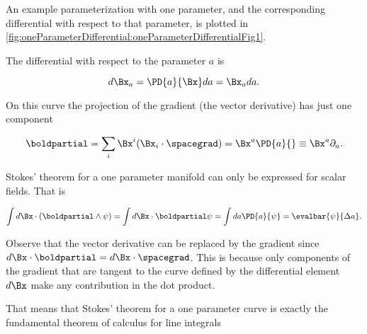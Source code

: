 %
%
An example parameterization with one parameter, and the corresponding differential with respect to that parameter, is plotted in
\cref{fig:oneParameterDifferential:oneParameterDifferentialFig1}.


The differential with respect to the parameter \( a \) is

\begin{equation}\label{eqn:oneparameter:20}
d\Bx_a = \PD{a}{\Bx} da = \Bx_a da.
\end{equation}

On this curve the projection of the gradient (the vector derivative) has just one component

\begin{dmath}\label{eqn:oneparameter:40}
\boldpartial
=
\sum_i \Bx^i (\Bx_i \cdot \spacegrad)
=
\Bx^a \PD{a}{}
\equiv
\Bx^a \partial_a.
\end{dmath}

Stokes' theorem for a one parameter manifold can only be expressed for scalar fields.
That is

\begin{dmath}\label{eqn:oneparameter:60}
\int d\Bx \cdot (\boldpartial \wedge \psi)
=
\int d\Bx \cdot \boldpartial \psi
=
\int da \PD{a}{ \psi }
= \evalbar{\psi}{\Delta a}.
\end{dmath}

Observe that the vector derivative can be replaced by the gradient since \( d\Bx \cdot \boldpartial = d\Bx \cdot \spacegrad \).
This is because only components of the gradient that are tangent to the curve defined by the differential element \( d\Bx \) make any contribution in the dot product.

That means that Stokes' theorem for a one parameter curve is exactly the fundamental theorem of calculus for line integrals

